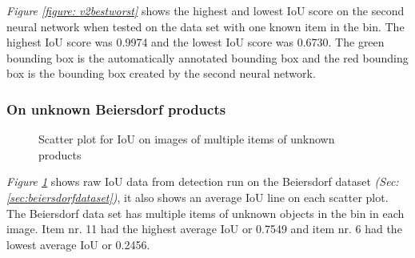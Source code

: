 \textit{Figure \ref{figure: v2bestworst}} shows the highest and lowest IoU score on the second neural network when tested on the data set with one known item in the bin. The highest IoU score was 0.9974 and the lowest IoU score was 0.6730. The green bounding box is the automatically annotated bounding box and the red bounding box is the bounding box created by the second neural network.

\clearpage
\subsubsection{On unknown Beiersdorf products}\label{subsec:v2resunknownprod}

\begin{figure}[h]
 \centering
 \hfill
 \caption{Scatter plot for IoU on images of multiple items of unknown products}
 \label{figure: v2unknownproducts}
\end{figure}

\textit{Figure \ref{figure: v2unknownproducts}} shows raw IoU data from detection run on the Beiersdorf dataset \textit{(Sec: \ref{sec:beiersdorfdataset})}, it also shows an average IoU line on each scatter plot. The Beiersdorf data set has multiple items of unknown objects in the bin in each image.
Item nr. 11 had the highest average IoU or 0.7549 and item nr. 6 had the lowest average IoU or 0.2456. 

